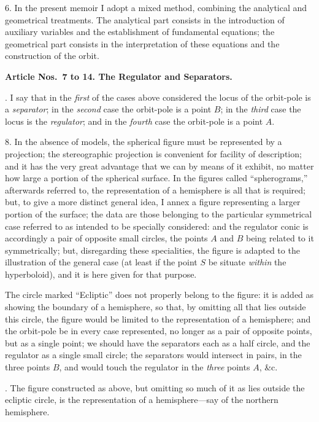 \documentclass[11pt,a4paper]{article}
\theoremstyle{definition}
\begin{document}
6. In the present memoir I adopt a mixed method, combining the analytical and
geometrical treatments. The analytical part consists in the introduction of auxiliary
variables and the establishment of fundamental equations; the geometrical part consists
in the interpretation of these equations and the construction of the orbit.

\newpage
\noindent
\textbf{Article Nos.~7 to 14. The Regulator and Separators.}

\smallskip

. I say that in the \textit{first} of the cases above considered the locus of the orbit-pole is
a \textit{separator}; in the \textit{second} case the orbit-pole is a point $B$; in the \textit{third} case
the locus is the \textit{regulator}; and in the \textit{fourth} case the orbit-pole is a point $A$.

8. In the absence of models, the spherical figure must be represented by a projection;
the stereographic projection is convenient for facility of description; and it has the very
great advantage that we can by means of it exhibit, no matter how large a portion of the
spherical surface. In the figures called ``spherograms,'' afterwards referred to, the representation
of a hemisphere is all that is required; but, to give a more distinct general
idea, I annex a figure representing a larger portion of the surface; the data are those
belonging to the particular symmetrical case referred to as intended to be specially
considered: and the regulator conic is accordingly a pair of opposite small circles, the
points $A$ and $B$ being related to it symmetrically; but, disregarding these specialities,
the figure is adapted to the illustration of the general case (at least if the point $S$ be
situate \textit{within} the hyperboloid), and it is here given for that purpose.

The circle marked ``Ecliptic'' does not properly belong to the figure: it is added as
showing the boundary of a hemisphere, so that, by omitting all that lies outside this
circle, the figure would be limited to the representation of a hemisphere; and the orbit-pole
be in every case represented, no longer as a pair of opposite points, but as a single
point; we should have the separators each as a half circle, and the regulator as a single
small circle; the separators would intersect in pairs, in the three points $B$, and would
touch the regulator in the \textit{three} points $A$, \&c.

\newpage
{}. The figure constructed as above, but omitting so much of it as lies outside the
ecliptic circle, is the representation of a hemisphere---say of the northern hemisphere.
\end{document}
